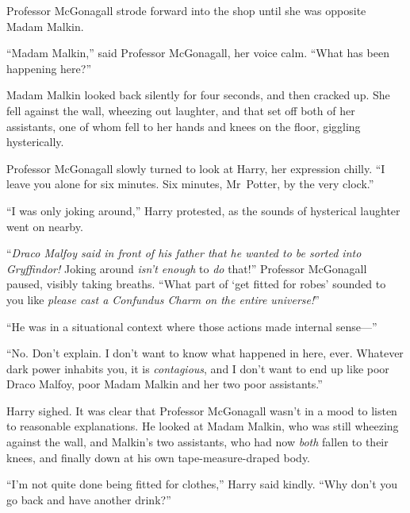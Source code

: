 Professor McGonagall strode forward into the shop until she was opposite Madam Malkin.

“Madam Malkin,” said Professor McGonagall, her voice calm. “What has been happening here?”

Madam Malkin looked back silently for four seconds, and then cracked up. She fell against the wall, wheezing out laughter, and that set off both of her assistants, one of whom fell to her hands and knees on the floor, giggling hysterically.

Professor McGonagall slowly turned to look at Harry, her expression chilly. “I leave you alone for six minutes. Six minutes, Mr~Potter, by the very clock.”

“I was only joking around,” Harry protested, as the sounds of hysterical laughter went on nearby.

“\emph{Draco Malfoy said in front of his father that he wanted to be sorted into Gryffindor!} Joking around \emph{isn’t enough} to \emph{do} that!” Professor McGonagall paused, visibly taking breaths. “What part of ‘get fitted for robes’ sounded to you like \emph{please cast a Confundus Charm on the entire universe!}”

“He was in a situational context where those actions made internal sense—”

“No. Don’t explain. I don’t want to know what happened in here, ever. Whatever dark power inhabits you, it is \emph{contagious}, and I don’t want to end up like poor Draco Malfoy, poor Madam Malkin and her two poor assistants.”

Harry sighed. It was clear that Professor McGonagall wasn’t in a mood to listen to reasonable explanations. He looked at Madam Malkin, who was still wheezing against the wall, and Malkin’s two assistants, who had now \emph{both} fallen to their knees, and finally down at his own tape-measure-draped body.

“I’m not quite done being fitted for clothes,” Harry said kindly. “Why don’t you go back and have another drink?”

